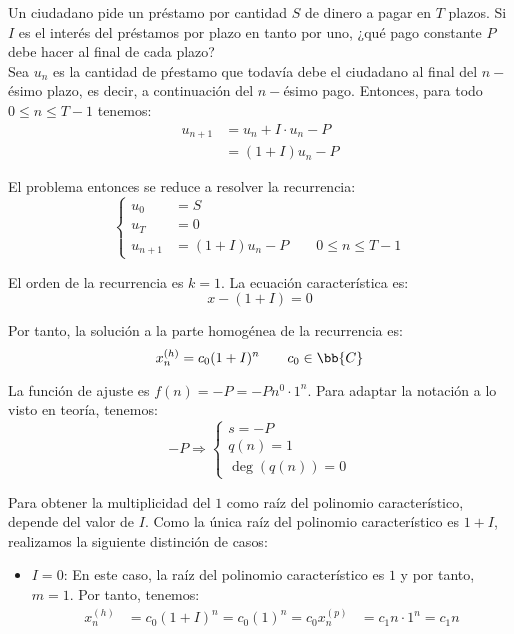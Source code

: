 \begin{ejercicio}
    Un ciudadano pide un préstamo por cantidad $S$ de dinero a pagar en $T$ plazos. Si $I$ es el interés del préstamos por plazo en tanto por uno, ¿qué pago constante $P$ debe hacer al final de cada plazo?\\

   Sea $u_n$ es la cantidad de pŕestamo que todavía debe el ciudadano al final del $n-$ésimo plazo,
   es decir, a continuación del $n-$ésimo pago. 
   Entonces, para todo $0 \leq n \leq T-1$ tenemos:
    \begin{align*}
        u_{n+1} &= u_n + I \cdot u_n - P \\
                &= (1+I) u_n - P
    \end{align*}
    
    El problema entonces se reduce a resolver la recurrencia:
    \begin{equation*}
        \left\{
            \begin{array}{rl}
                u_0 &= S \\
                u_T &= 0 \\
                u_{n+1} &= (1+I)u_n - P \qquad 0 \leq n \leq T - 1
            \end{array}
        \right.
    \end{equation*}

    El orden de la recurrencia es $k=1$. La ecuación característica es:
    \begin{equation*}
        x - (1+I) = 0
    \end{equation*}

    Por tanto, la solución a la parte homogénea de la recurrencia es:
    \begin{equation*}
        x_n^{(h)} = c_0(1+I)^n \qquad c_0\in \bb{C}
    \end{equation*}

    La función de ajuste es $f(n) = -P = -Pn^0\cdot 1^n$. Para adaptar la notación a lo visto en teoría, tenemos:
    \begin{equation*}
        -P\Longrightarrow \left\{\begin{array}{l}
            s = -P \\
            q(n) = 1 \\
            \deg(q(n)) = 0
        \end{array}\right.
    \end{equation*}

    Para obtener la multiplicidad del $1$ como raíz del polinomio característico, depende del valor de $I$.
    Como la única raíz del polinomio característico es $1+I$, realizamos la siguiente distinción de casos:
    \begin{itemize}
        \item \ul{$I = 0$}: En este caso, la raíz del polinomio característico es $1$ y por tanto, $m=1$.
        Por tanto, tenemos:
        \begin{align*}
            x_n^{(h)} &= c_0(1+I)^n = c_0(1)^n = c_0
            x_n^{(p)} &= c_1 n\cdot 1^n = c_1n
        \end{align*}


\end{itemize}
\end{ejercicio}
